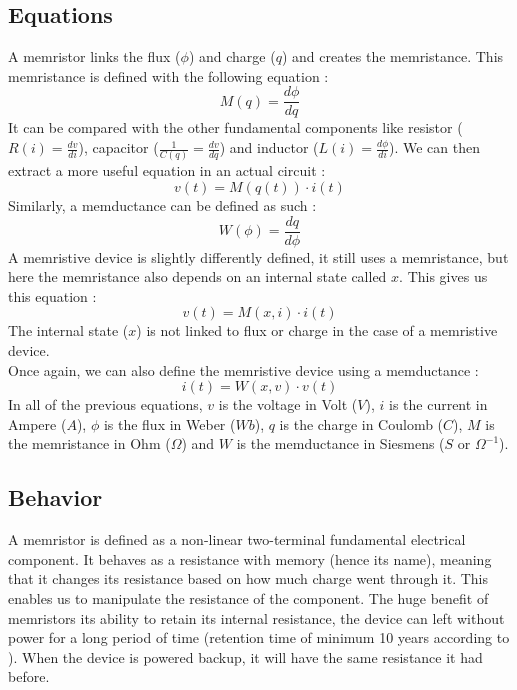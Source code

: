 \subsection{Equations}
A memristor links the flux ($\phi$) and charge ($q$) and creates the memristance.
This memristance is defined with the following equation :
\begin{equation}
  M(q)=\frac{d\phi}{dq}
\end{equation}
It can be compared with the other fundamental components like resistor ($R(i)=\frac{dv}{di}$), capacitor ($\frac{1}{C(q)}=\frac{dv}{dq}$) and inductor ($L(i)=\frac{d\phi}{di}$).
We can then extract a more useful equation in an actual circuit :
\begin{equation}
  v(t)=M(q(t))\cdot i(t)
\end{equation}
Similarly, a memductance can be defined as such :
\begin{equation}
  W(\phi)=\frac{dq}{d\phi}
\end{equation}
A memristive device is slightly differently defined, it still uses a memristance, but here the memristance also depends on an internal state called $x$. This gives us this equation :
\begin{equation}
  v(t)=M(x,i)\cdot i(t)
\end{equation}
The internal state ($x$) is not linked to flux or charge in the case of a memristive device.\\
Once again, we can also define the memristive device using a memductance :
\begin{equation}
  i(t)=W(x,v)\cdot v(t)
\end{equation}
In all of the previous equations, $v$ is the voltage in Volt ($V$), $i$ is the current in Ampere ($A$), $\phi$ is the flux in Weber ($Wb$), $q$ is the charge in Coulomb ($C$), $M$ is the memristance in Ohm ($\Omega$) and $W$ is the memductance in Siesmens ($S$ or $\Omega^{-1}$).

\subsection{Behavior}

A memristor is defined as a non-linear two-terminal fundamental electrical component. It behaves as a resistance with memory (hence its name), meaning that it changes its resistance based on how much charge went through it. This enables us to manipulate the resistance of the component.
The huge benefit of memristors its ability to retain its internal resistance, the device can left without power for a long period of time (retention time of minimum 10 years according to \cite{memRetention}). When the device is powered backup, it will have the same resistance it had before.

